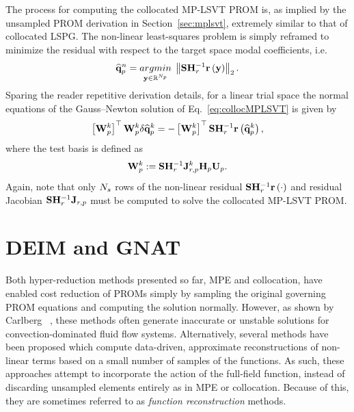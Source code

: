 The process for computing the collocated MP-LSVT PROM is, as implied by the unsampled PROM derivation in Section~\ref{sec:mplsvt}, extremely similar to that of collocated LSPG. The non-linear least-squares problem is simply reframed to minimize the residual with respect to the target space modal coefficients, i.e.
%
\begin{equation}\label{eq:collocMPLSVT}
	\primVecCoef^{\timeIdx} = \argmin{\dummyVec \inROne{\numPrimModes}} \left\Vert \sampMat \resScaleInv \resFunc{\dummyVec} \right\Vert_2.
\end{equation}
%
Sparing the reader repetitive derivation details, for a linear trial space the normal equations of the Gauss--Newton solution of Eq.~\ref{eq:collocMPLSVT} is given by
%
\begin{equation}
    \left[\testBasisPrim^{\newtonIdx}\right]^\top \testBasisPrim^{\newtonIdx} \delta \primVecCoef^{\newtonIdx} = -\left[\testBasisPrim^{\newtonIdx}\right]^\top \sampMat \resScaleInv \resFunc{\primVecCoef^{\newtonIdx}},
\end{equation}
%
where the test basis is defined as
%
\begin{equation}
    \testBasisPrim^\newtonIdx \defEq \sampMat \resScaleInv \jacobResPrim^\newtonIdx \primScale \primTrial.
\end{equation}
%
Again, note that only $N_s$ rows of the non-linear residual $\sampMat \resScaleInv \resFunc{\cdot}$ and residual Jacobian $\sampMat \resScaleInv \jacobResPrim$ must be computed to solve the collocated MP-LSVT PROM.

\section{DEIM and GNAT}\label{subsec:gappyPOD}
%
Both hyper-reduction methods presented so far, MPE and collocation, have enabled cost reduction of PROMs simply by sampling the original governing PROM equations and computing the solution normally. However, as shown by Carlberg ~\cite{Carlberg2013}, these methods often generate inaccurate or unstable solutions for convection-dominated fluid flow systems. Alternatively, several methods have been proposed which compute data-driven, approximate reconstructions of non-linear terms based on a small number of samples of the functions. As such, these approaches attempt to incorporate the action of the full-field function, instead of discarding unsampled elements entirely as in MPE or collocation. Because of this, they are sometimes referred to as \textit{function reconstruction} methods.

